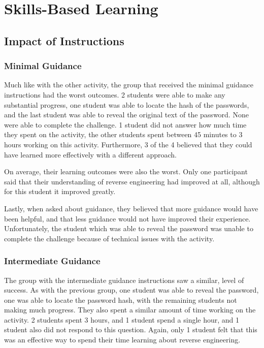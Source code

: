 \section{Skills-Based Learning}
    \subsection{Impact of Instructions}
        \subsubsection*{Minimal Guidance}
            Much like with the other activity, the group that received the minimal guidance instructions had the worst outcomes. %
2 students were able to make any substantial progress, one student was able to locate the hash of the passwords, and the last student was able to reveal the original text of the password. %
None were able to complete the challenge. %
1 student did not answer how much time they spent on the activity, the other students spent between 45 minutes to 3 hours working on this activity. %
Furthermore, 3 of the 4 believed that they could have learned more effectively with a different approach.

            On average, their learning outcomes were also the worst. %
Only one participant said that their understanding of reverse engineering had improved at all, although for this student it improved greatly. 

            Lastly, when asked about guidance, they believed that more guidance would have been helpful, and that less guidance would not have improved their experience. %
Unfortunately, the student which was able to reveal the password was unable to complete the challenge because of technical issues with the activity. 

        \subsubsection*{Intermediate Guidance}
            The group with the intermediate guidance instructions saw a similar, level of success. %
As with the previous group, one student was able to reveal the password, one was able to locate the password hash, with the remaining students not making much progress. %
They also spent a similar amount of time working on the activity. %
2 students spent 3 hours, and 1 student spend a single hour, and 1 student also did not respond to this question. %
Again, only 1 student felt that this was an effective way to spend their time learning about reverse engineering. 

